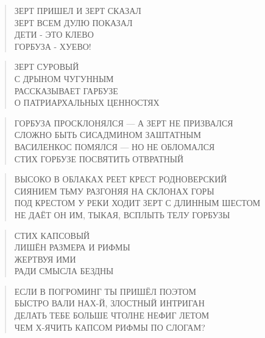 \poemtitle{***}
\begin{verse}
ЗЕРТ ПРИШЕЛ И ЗЕРТ СКАЗАЛ\\
ЗЕРТ ВСЕМ ДУЛЮ ПОКАЗАЛ\\
ДЕТИ - ЭТО КЛЕВО\\
ГОРБУЗА - ХУЕВО!
\end{verse}

\poemtitle{***}
\begin{verse}
ЗЕРТ СУРОВЫЙ\\
С ДРЫНОМ ЧУГУННЫМ\\
РАССКАЗЫВАЕТ ГАРБУЗЕ\\
О ПАТРИАРХАЛЬНЫХ ЦЕННОСТЯХ
\end{verse}

\poemtitle{***}
\begin{verse}
ГОРБУЗА ПРОСКЛОНЯЛСЯ — А ЗЕРТ НЕ ПРИЗВАЛСЯ\\
СЛОЖНО БЫТЬ СИСАДМИНОМ ЗАШТАТНЫМ\\
ВАСИЛЕНКОС ПОМЯЛСЯ — НО НЕ ОБЛОМАЛСЯ\\
СТИХ ГОРБУЗЕ ПОСВЯТИТЬ ОТВРАТНЫЙ
\end{verse}

\poemtitle{***}
\begin{verse}
ВЫСОКО В ОБЛАКАХ РЕЕТ КРЕСТ РОДНОВЕРСКИЙ\\
СИЯНИЕМ ТЬМУ РАЗГОНЯЯ НА СКЛОНАХ ГОРЫ\\
ПОД КРЕСТОМ У РЕКИ ХОДИТ ЗЕРТ С ДЛИННЫМ ШЕСТОМ\\
НЕ ДАЁТ ОН ИМ, ТЫКАЯ, ВСПЛЫТЬ ТЕЛУ ГОРБУЗЫ
\end{verse}

\poemtitle{***}
\begin{verse}
СТИХ КАПСОВЫЙ\\
ЛИШЁН РАЗМЕРА И РИФМЫ\\
ЖЕРТВУЯ ИМИ\\
РАДИ СМЫСЛА БЕЗДНЫ
\end{verse}

\poemtitle{***}
\begin{verse}
ЕСЛИ В ПОГРОМИНГ ТЫ ПРИШЁЛ ПОЭТОМ\\
БЫСТРО ВАЛИ НАХ-Й, ЗЛОСТНЫЙ ИНТРИГАН\\
ДЕЛАТЬ ТЕБЕ БОЛЬШЕ ЧТОЛНЕ НЕФИГ ЛЕТОМ\\
ЧЕМ Х-ЯЧИТЬ КАПСОМ РИФМЫ ПО СЛОГАМ?
\end{verse}

